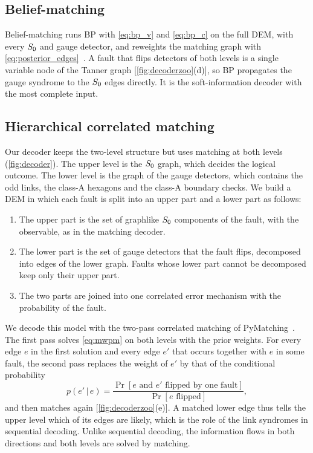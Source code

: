\subsection{Belief-matching}

Belief-matching runs BP with \autoref{eq:bp_v} and \autoref{eq:bp_c} on the full DEM, with every $S_0$ and gauge detector, and reweights the matching graph with \autoref{eq:posterior_edges}~\cite{higgott2023}. A fault that flips detectors of both levels is a single variable node of the Tanner graph [\autoref{fig:decoderzoo}(d)], so BP propagates the gauge syndrome to the $S_0$ edges directly. It is the soft-information decoder with the most complete input.

\subsection{Hierarchical correlated matching}
\label{sec:hcm}

Our decoder keeps the two-level structure but uses matching at both levels (\autoref{fig:decoder}). The upper level is the $S_0$ graph, which decides the logical outcome. The lower level is the graph of the gauge detectors, which contains the odd links, the class-A hexagons and the class-A boundary checks. We build a DEM in which each fault is split into an upper part and a lower part as follows:
\begin{enumerate}
  \item The upper part is the set of graphlike $S_0$ components of the fault, with the observable, as in the matching decoder.
  \item The lower part is the set of gauge detectors that the fault flips, decomposed into edges of the lower graph. Faults whose lower part cannot be decomposed keep only their upper part.
  \item The two parts are joined into one correlated error mechanism with the probability of the fault.
\end{enumerate}
We decode this model with the two-pass correlated matching of PyMatching~\cite{fowler2013,higgott2025sparse}. The first pass solves \autoref{eq:mwpm} on both levels with the prior weights. For every edge $e$ in the first solution and every edge $e'$ that occurs together with $e$ in some fault, the second pass replaces the weight of $e'$ by that of the conditional probability
\begin{equation}
  p(e'\,|\,e)=\frac{\Pr[e\text{ and }e'\text{ flipped by one fault}]}{\Pr[e\text{ flipped}]},
  \label{eq:conditional}
\end{equation}
and then matches again [\autoref{fig:decoderzoo}(e)]. A matched lower edge thus tells the upper level which of its edges are likely, which is the role of the link syndromes in sequential decoding. Unlike sequential decoding, the information flows in both directions and both levels are solved by matching.

